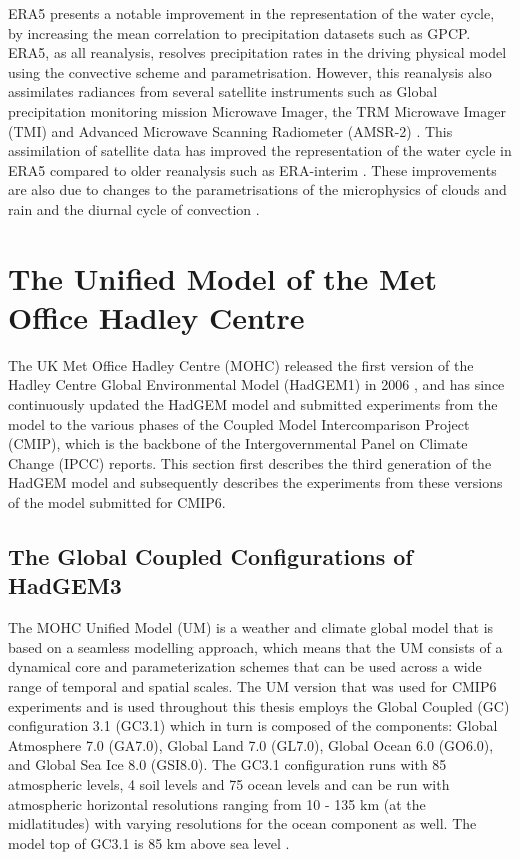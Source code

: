 ERA5 presents a notable improvement in the representation of the water cycle, by increasing the mean correlation to precipitation datasets such as GPCP. 
ERA5, as all reanalysis, resolves precipitation rates in the driving physical model using the convective scheme and parametrisation. However, this reanalysis also assimilates radiances from several satellite instruments such as Global precipitation monitoring mission Microwave Imager, the TRM Microwave Imager (TMI) and Advanced Microwave Scanning Radiometer (AMSR-2) \cite{era5hersbach}. This assimilation of satellite data has improved the representation of the water cycle in ERA5 compared to older reanalysis such as ERA-interim \citep[e.g.][]{henin2018assessing}. These improvements are also due to changes to the parametrisations of the microphysics of clouds and rain \citep{forbes2014} and the diurnal cycle of convection \citep{bechtold2014}. 




\section{The Unified Model of the Met Office Hadley Centre}\label{sq:modeldata}

The UK Met Office Hadley Centre (MOHC) released the first version of the Hadley Centre Global Environmental Model (HadGEM1) in 2006 \citep{johns2006}, and has since continuously updated the HadGEM model and submitted experiments from the model to the various phases of the Coupled Model Intercomparison Project (CMIP), which is the backbone of the Intergovernmental Panel on Climate Change (IPCC) reports. This section first describes the third generation of the HadGEM model and subsequently describes the experiments from these versions of the model submitted for CMIP6.  



\subsection{The Global Coupled Configurations of HadGEM3}

The MOHC Unified Model (UM) is a weather and climate global model that is based on a seamless modelling approach, which means that the UM consists of a dynamical core and parameterization schemes that can be used across a wide range of temporal and spatial scales. 
The UM version that was used for CMIP6 experiments and is used throughout this thesis employs the Global Coupled (GC) configuration 3.1 (GC3.1) \citep{williams2018,walters2019} which in turn is composed of the components: Global Atmosphere 7.0 (GA7.0), Global Land 7.0
(GL7.0), Global Ocean 6.0 (GO6.0), and Global Sea Ice 8.0 (GSI8.0).
The GC3.1 configuration runs with 85 atmospheric levels, 4 soil levels and 75 ocean levels and can be run with atmospheric horizontal resolutions ranging from 10 - 135 km (at the midlatitudes) with varying resolutions for the ocean component as well. The model top of GC3.1 is 85 km above sea level \citep{walters2019}. 


